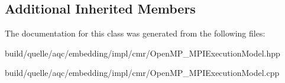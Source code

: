 \subsection*{Additional Inherited Members}


The documentation for this class was generated from the following files\+:\begin{DoxyCompactItemize}
\item 
build/quelle/aqc/embedding/impl/cmr/\+Open\+M\+P\+\_\+\+M\+P\+I\+Execution\+Model.\+hpp\item 
build/quelle/aqc/embedding/impl/cmr/\+Open\+M\+P\+\_\+\+M\+P\+I\+Execution\+Model.\+cpp\end{DoxyCompactItemize}
